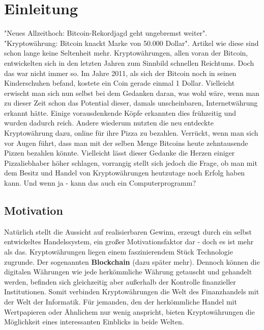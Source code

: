 \documentclass[oneside]{ausarbeitung}
\begin{document}
\cleardoublepage
{}
\setcounter{page}{1}

\chapter{Einleitung}
\label{cha:einleitung}

"Neues Allzeithoch: Bitcoin-Rekordjagd geht ungebremst
weiter"\cite{bitcoin_artikel_1}. "Kryptowährung: Bitcoin knackt Marke
von 50.000 Dollar"\cite{bitcoin_artikel_2}. Artikel wie diese sind
schon lange keine Seltenheit mehr. Kryptowährungen, allen voran der
Bitcoin, entwickelten sich in den letzten Jahren zum Sinnbild
schnellen Reichtums. Doch das war nicht immer so. Im Jahre 2011, als
sich der Bitcoin noch in seinen Kinderschuhen befand, kostete ein Coin
gerade einmal 1 Dollar\cite{bitcoin_kurs_2011}. Vielleicht erwischt
man sich nun selbst bei dem Gedanken daran, was wohl wäre, wenn man
zu dieser Zeit schon das Potential dieser, damals unscheinbaren,
Internetwährung erkannt hätte. Einige vorausdenkende Köpfe
erkannten dies frühzeitig und wurden dadurch reich. Andere wiederum
nutzten die neu entdeckte Kryptowährung dazu, online für ihre Pizza
zu bezahlen. Verrückt, wenn man sich vor Augen führt, dass man mit
der selben Menge Bitcoins heute zehntausende Pizzen bezahlen könnte.
Vielleicht lässt dieser Gedanke die Herzen einiger Pizzaliebhaber
höher schlagen, vorrangig stellt sich jedoch die Frage, ob man mit
dem Besitz und Handel von Kryptowährungen heutzutage noch Erfolg
haben kann. Und wenn ja - kann das auch ein Computerprogramm?


\section{Motivation}
\label{sec:motivation}

Natürlich stellt die Aussicht auf realisierbaren Gewinn, erzeugt
durch ein selbst entwickeltes Handelssystem, ein großer
Motivationsfaktor dar - doch es ist mehr als das. Kryptowährungen
liegen einem faszinierendem Stück Technologie zugrunde. Der
sogenannten \textbf{Blockchain} (dazu später mehr). Dennoch können
die digitalen Währungen wie jede herkömmliche Währung getauscht und
gehandelt werden, befinden sich gleichzeitig aber außerhalb der
Kontrolle finanzieller Institutionen. Somit verbinden Kryptowährungen
die Welt des Finanzhandels mit der Welt der Informatik. Für jemanden,
den der herkömmliche Handel mit Wertpapieren oder Ähnlichem nur
wenig anspricht, bieten Kryptowährungen die Möglichkeit eines
interessanten Einblicks in beide Welten. 
\end{document}
